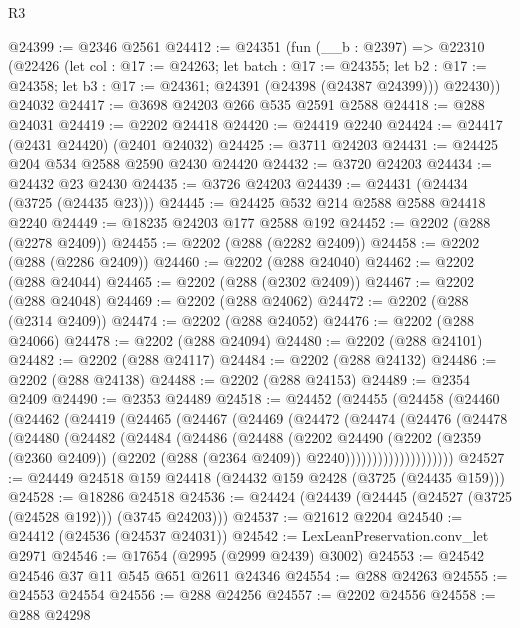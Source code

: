 \begin{lexlean}{R3}
\begin{coremodule}
@24399 := @2346 @2561
@24412 := @24351
    (fun (__b : @2397) =>
    @22310
      (@22426
        (let col : @17 := @24263;
        let batch : @17 := @24355;
        let b2 : @17 := @24358; let b3 : @17 := @24361; @24391 (@24398 (@24387 @24399)))
        @22430))
    @24032
@24417 := @3698 @24203 @266 @535 @2591 @2588
@24418 := @288 @24031
@24419 := @2202 @24418
@24420 := @24419 @2240
@24424 := @24417 (@2431 @24420) (@2401 @24032)
@24425 := @3711 @24203
@24431 := @24425 @204 @534 @2588 @2590 @2430 @24420
@24432 := @3720 @24203
@24434 := @24432 @23 @2430
@24435 := @3726 @24203
@24439 := @24431 (@24434 (@3725 (@24435 @23)))
@24445 := @24425 @532 @214 @2588 @2588 @24418 @2240
@24449 := @18235 @24203 @177 @2588 @192
@24452 := @2202 (@288 (@2278 @2409))
@24455 := @2202 (@288 (@2282 @2409))
@24458 := @2202 (@288 (@2286 @2409))
@24460 := @2202 (@288 @24040)
@24462 := @2202 (@288 @24044)
@24465 := @2202 (@288 (@2302 @2409))
@24467 := @2202 (@288 @24048)
@24469 := @2202 (@288 @24062)
@24472 := @2202 (@288 (@2314 @2409))
@24474 := @2202 (@288 @24052)
@24476 := @2202 (@288 @24066)
@24478 := @2202 (@288 @24094)
@24480 := @2202 (@288 @24101)
@24482 := @2202 (@288 @24117)
@24484 := @2202 (@288 @24132)
@24486 := @2202 (@288 @24138)
@24488 := @2202 (@288 @24153)
@24489 := @2354 @2409
@24490 := @2353 @24489
@24518 := @24452
    (@24455
      (@24458
        (@24460
          (@24462
            (@24419
              (@24465
                (@24467
                  (@24469
                    (@24472
                      (@24474
                        (@24476
                          (@24478
                            (@24480
                              (@24482
                                (@24484
                                  (@24486
                                    (@24488
                                      (@2202
                                        @24490
                                        (@2202
                                          (@2359 (@2360 @2409))
                                          (@2202 (@288 (@2364 @2409)) @2240))))))))))))))))))))
@24527 := @24449 @24518 @159 @24418 (@24432 @159 @2428 (@3725 (@24435 @159)))
@24528 := @18286 @24518
@24536 := @24424 (@24439 (@24445 (@24527 (@3725 (@24528 @192))) (@3745 @24203)))
@24537 := @21612 @2204
@24540 := @24412 (@24536 (@24537 @24031))
@24542 := LexLeanPreservation.conv_let @2971
@24546 := @17654 (@2995 (@2999 @2439) @3002)
@24553 := @24542 @24546 @37 @11 @545 @651 @2611 @24346
@24554 := @288 @24263
@24555 := @24553 @24554
@24556 := @288 @24256
@24557 := @2202 @24556
@24558 := @288 @24298

\end{coremodule}
\end{lexlean}
